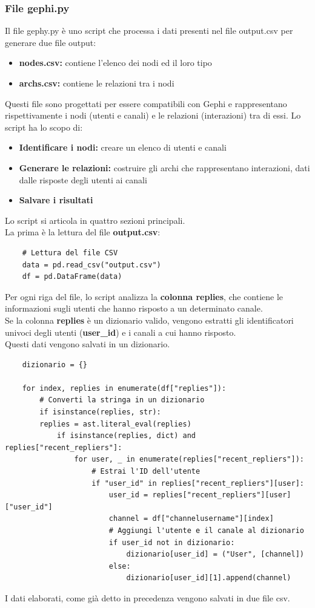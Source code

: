 \documentclass[12pt]{article}
\begin{document}
	\subsubsection{File gephi.py}
	Il file gephy.py è uno script che processa i dati presenti nel file output.csv per generare due file output:
	\begin{itemize}[label=]
		\item \textbf{nodes.csv:} contiene l'elenco dei nodi ed il loro tipo
		\item \textbf{archs.csv:} contiene le relazioni tra i nodi
	\end{itemize}
	Questi file sono progettati per essere compatibili con Gephi e rappresentano rispettivamente i nodi (utenti e canali) e le relazioni (interazioni) tra di essi.
	Lo script ha lo scopo di:
	\begin{itemize}[label=]
		\item \textbf{Identificare i nodi:} creare un elenco di utenti e canali
		\item \textbf{Generare le relazioni:} costruire gli archi che rappresentano interazioni, dati dalle risposte degli utenti ai canali
		\item \textbf{Salvare i risultati}
	\end{itemize}
	Lo script si articola in quattro sezioni principali.\\
	La prima è la lettura del file \textbf{output.csv}:
	\begin{lstlisting}
	# Lettura del file CSV
	data = pd.read_csv("output.csv")
	df = pd.DataFrame(data)
	\end{lstlisting}
	Per ogni riga del file, lo script analizza la \textbf{colonna replies}, che contiene le informazioni sugli utenti che hanno risposto a un determinato canale.\\
	Se la colonna \textbf{replies} è un dizionario valido, vengono estratti gli identificatori univoci degli utenti (\textbf{user\_id}) e i canali a cui hanno risposto.\\
	Questi dati vengono salvati in un dizionario.
	\begin{lstlisting}
	dizionario = {}
		
	for index, replies in enumerate(df["replies"]):
		# Converti la stringa in un dizionario
		if isinstance(replies, str):
		replies = ast.literal_eval(replies)
			if isinstance(replies, dict) and replies["recent_repliers"]:
				for user, _ in enumerate(replies["recent_repliers"]):
					# Estrai l'ID dell'utente
					if "user_id" in replies["recent_repliers"][user]:
						user_id = replies["recent_repliers"][user]["user_id"]
						channel = df["channelusername"][index]
						# Aggiungi l'utente e il canale al dizionario
						if user_id not in dizionario:
							dizionario[user_id] = ("User", [channel])
						else:
							dizionario[user_id][1].append(channel)
	\end{lstlisting}
	I dati elaborati, come già detto in precedenza vengono salvati in due file csv.
\end{document}
